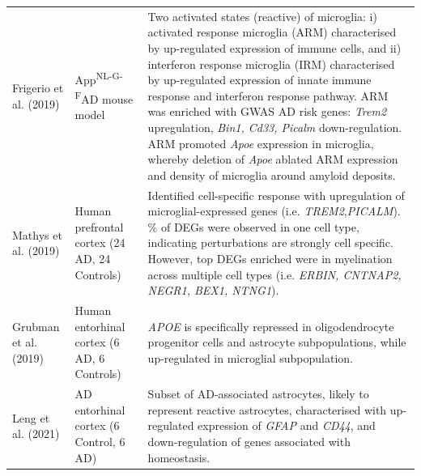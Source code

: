 \begin{landscape}
\begin{longtable}[c]{p{4cm}p{4cm}p{18cm}}
		\centering Frigerio et al. (2019)\cite{Frigerio2019} &
		\centering App\textsuperscript{NL-G-F}\newline AD mouse model  &
		\tabitem Two activated states (reactive) of microglia: i) activated response microglia (ARM) characterised by up-regulated expression of immune cells, and ii) interferon response microglia (IRM) characterised by up-regulated expression of innate immune response and interferon response pathway.  \newline
		\tabitem ARM was enriched with GWAS AD risk genes: \textit{Trem2} upregulation, \textit{Bin1, Cd33, Picalm} down-regulation.  \newline
		\tabitem ARM promoted \textit{Apoe} expression in microglia, whereby deletion of \textit{Apoe} ablated ARM expression and density of microglia around amyloid deposits. \\
		\hdashline[0.5pt/5pt]
		
		\centering Mathys et al. (2019)\cite{Mathys2019} &
		\centering Human prefrontal cortex (24 AD, 24 Controls)  &
		\tabitem Identified cell-specific response with upregulation of microglial-expressed genes (i.e. \textit{TREM2},\textit{PICALM}). \newline
		\tabitem 95\% of DEGs were observed in one cell type, indicating perturbations are strongly cell specific.  However, top DEGs enriched were in myelination across multiple cell types (i.e. \textit{ERBIN, CNTNAP2, NEGR1, BEX1, NTNG1}).   \\
		\hdashline[0.5pt/5pt]
		
		\centering Grubman et al. (2019)\cite{Grubman2019} &
		\centering Human entorhinal cortex (6 AD, 6 Controls)  &
		\tabitem \textit{APOE} is specifically repressed in oligodendrocyte progenitor cells and astrocyte subpopulations, while up-regulated in microglial subpopulation.  \\
		\hdashline[0.5pt/5pt]
		
		\centering Leng et al. (2021)\cite{Leng2021} &
		\centering AD entorhinal cortex \newline(6 Control, 6 AD)  &
		\tabitem Subset of AD-associated astrocytes, likely to represent reactive astrocytes, characterised with up-regulated expression of \textit{GFAP} and \textit{CD44}, and down-regulation of genes associated with homeostasis.  		
		\\* \bottomrule
	\end{longtable}
\end{landscape}
\restoregeometry


